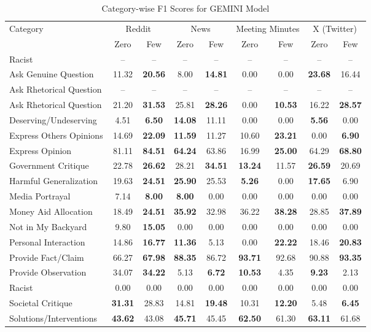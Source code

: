 \begin{table*}[htbp]
\centering
\begin{tabular}{l *{8}{c}}
\toprule
Category & \multicolumn{2}{c}{Reddit} & \multicolumn{2}{c}{News} & \multicolumn{2}{c}{Meeting Minutes} & \multicolumn{2}{c}{X (Twitter)} \\
& Zero & Few & Zero & Few & Zero & Few & Zero & Few \\
\midrule
Racist & -- & -- & -- & -- & -- & -- & -- & -- \\
Ask Genuine Question & 11.32 & \textbf{20.56} & 8.00 & \textbf{14.81} & 0.00 & 0.00 & \textbf{23.68} & 16.44 \\
Ask Rhetorical Question & -- & -- & -- & -- & -- & -- & -- & -- \\
Ask Rhetorical Question & 21.20 & \textbf{31.53} & 25.81 & \textbf{28.26} & 0.00 & \textbf{10.53} & 16.22 & \textbf{28.57} \\
Deserving/Undeserving & 4.51 & \textbf{6.50} & \textbf{14.08} & 11.11 & 0.00 & 0.00 & \textbf{5.56} & 0.00 \\
Express Others Opinions & 14.69 & \textbf{22.09} & \textbf{11.59} & 11.27 & 10.60 & \textbf{23.21} & 0.00 & \textbf{6.90} \\
Express Opinion & 81.11 & \textbf{84.51} & \textbf{64.24} & 63.86 & 16.99 & \textbf{25.00} & 64.29 & \textbf{68.80} \\
Government Critique & 22.78 & \textbf{26.62} & 28.21 & \textbf{34.51} & \textbf{13.24} & 11.57 & \textbf{26.59} & 20.69 \\
Harmful Generalization & 19.63 & \textbf{24.51} & \textbf{25.90} & 25.53 & \textbf{5.26} & 0.00 & \textbf{17.65} & 6.90 \\
Media Portrayal & 7.14 & \textbf{8.00} & \textbf{8.00} & 0.00 & 0.00 & 0.00 & 0.00 & 0.00 \\
Money Aid Allocation & 18.49 & \textbf{24.51} & \textbf{35.92} & 32.98 & 36.22 & \textbf{38.28} & 28.85 & \textbf{37.89} \\
Not in My Backyard & 9.80 & \textbf{15.05} & 0.00 & 0.00 & 0.00 & 0.00 & 0.00 & 0.00 \\
Personal Interaction & 14.86 & \textbf{16.77} & \textbf{11.36} & 5.13 & 0.00 & \textbf{22.22} & 18.46 & \textbf{20.83} \\
Provide Fact/Claim & 66.27 & \textbf{67.98} & \textbf{88.35} & 86.72 & \textbf{93.71} & 92.68 & 90.88 & \textbf{93.35} \\
Provide Observation & 34.07 & \textbf{34.22} & 5.13 & \textbf{6.72} & \textbf{10.53} & 4.35 & \textbf{9.23} & 2.13 \\
Racist & 0.00 & 0.00 & 0.00 & 0.00 & 0.00 & 0.00 & 0.00 & 0.00 \\
Societal Critique & \textbf{31.31} & 28.83 & 14.81 & \textbf{19.48} & 10.31 & \textbf{12.20} & 5.48 & \textbf{6.45} \\
Solutions/Interventions & \textbf{43.62} & 43.08 & \textbf{45.71} & 45.45 & \textbf{62.50} & 61.30 & \textbf{63.11} & 61.68 \\
\bottomrule
\end{tabular}
\centering\caption{Category-wise F1 Scores for GEMINI Model}
\label{tab:gemini_category_breakdown}
\end{table*}